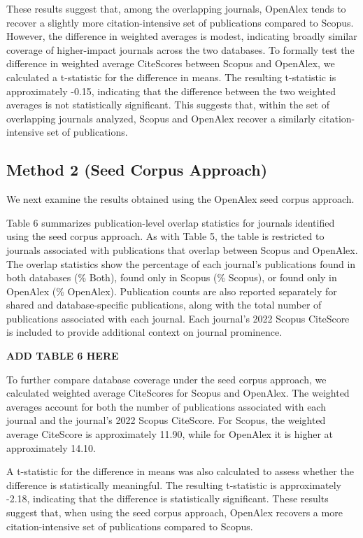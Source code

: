 \documentclass[
  letterpaper,
  DIV=11,
  numbers=noendperiod]{scrartcl}
\begin{document}
These results suggest that, among the overlapping journals, OpenAlex
tends to recover a slightly more citation-intensive set of publications
compared to Scopus. However, the difference in weighted averages is
modest, indicating broadly similar coverage of higher-impact journals
across the two databases. To formally test the difference in weighted
average CiteScores between Scopus and OpenAlex, we calculated a
t-statistic for the difference in means. The resulting t-statistic is
approximately -0.15, indicating that the difference between the two
weighted averages is not statistically significant. This suggests that,
within the set of overlapping journals analyzed, Scopus and OpenAlex
recover a similarly citation-intensive set of publications.

\subsection{\texorpdfstring{\Large Method 2 (Seed Corpus
Approach)}{Method 2 (Seed Corpus Approach)}}\label{method-2-seed-corpus-approach-1}

We next examine the results obtained using the OpenAlex seed corpus
approach.

Table 6 summarizes publication-level overlap statistics for journals
identified using the seed corpus approach. As with Table 5, the table is
restricted to journals associated with publications that overlap between
Scopus and OpenAlex. The overlap statistics show the percentage of each
journal's publications found in both databases (\% Both), found only in
Scopus (\% Scopus), or found only in OpenAlex (\% OpenAlex). Publication
counts are also reported separately for shared and database-specific
publications, along with the total number of publications associated
with each journal. Each journal's 2022 Scopus CiteScore is included to
provide additional context on journal prominence.

\textbf{ADD TABLE 6 HERE}

To further compare database coverage under the seed corpus approach, we
calculated weighted average CiteScores for Scopus and OpenAlex. The
weighted averages account for both the number of publications associated
with each journal and the journal's 2022 Scopus CiteScore. For Scopus,
the weighted average CiteScore is approximately 11.90, while for
OpenAlex it is higher at approximately 14.10.

A t-statistic for the difference in means was also calculated to assess
whether the difference is statistically meaningful. The resulting
t-statistic is approximately -2.18, indicating that the difference is
statistically significant. These results suggest that, when using the
seed corpus approach, OpenAlex recovers a more citation-intensive set of
publications compared to Scopus.
\end{document}
